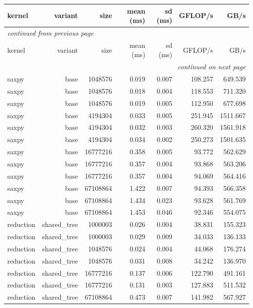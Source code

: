 \begin{longtable}{lrrrrrr}
\toprule
kernel & variant & size & mean (ms) & sd (ms) & GFLOP/s & GB/s \\
\midrule
\endfirsthead
\multicolumn{7}{l}{\small\itshape continued from previous page} \\
\toprule
kernel & variant & size & mean (ms) & sd (ms) & GFLOP/s & GB/s \\
\midrule
\endhead
\midrule
\multicolumn{7}{r}{\small\itshape continued on next page} \\
\endfoot
\bottomrule
\endlastfoot
saxpy & base & 1048576 & 0.019 & 0.007 & 108.257 & 649.539 \\
saxpy & base & 1048576 & 0.018 & 0.004 & 118.553 & 711.320 \\
saxpy & base & 1048576 & 0.019 & 0.005 & 112.950 & 677.698 \\
saxpy & base & 4194304 & 0.033 & 0.005 & 251.945 & 1511.667 \\
saxpy & base & 4194304 & 0.032 & 0.003 & 260.320 & 1561.918 \\
saxpy & base & 4194304 & 0.034 & 0.002 & 250.273 & 1501.635 \\
saxpy & base & 16777216 & 0.358 & 0.005 & 93.772 & 562.629 \\
saxpy & base & 16777216 & 0.357 & 0.004 & 93.868 & 563.206 \\
saxpy & base & 16777216 & 0.357 & 0.004 & 94.069 & 564.416 \\
saxpy & base & 67108864 & 1.422 & 0.007 & 94.393 & 566.358 \\
saxpy & base & 67108864 & 1.434 & 0.023 & 93.628 & 561.769 \\
saxpy & base & 67108864 & 1.453 & 0.046 & 92.346 & 554.075 \\
reduction & shared\_tree & 1000003 & 0.026 & 0.004 & 38.831 & 155.323 \\
reduction & shared\_tree & 1000003 & 0.029 & 0.009 & 34.033 & 136.133 \\
reduction & shared\_tree & 1048576 & 0.024 & 0.004 & 44.068 & 176.274 \\
reduction & shared\_tree & 1048576 & 0.031 & 0.008 & 34.242 & 136.970 \\
reduction & shared\_tree & 16777216 & 0.137 & 0.006 & 122.790 & 491.161 \\
reduction & shared\_tree & 16777216 & 0.131 & 0.003 & 127.883 & 511.532 \\
reduction & shared\_tree & 67108864 & 0.473 & 0.007 & 141.982 & 567.927 \\

\end{longtable}
